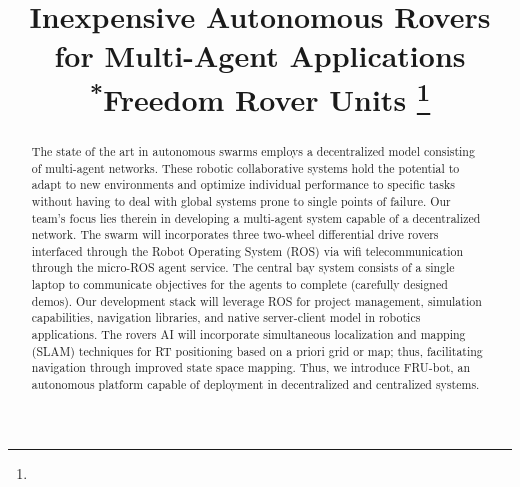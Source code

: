 \documentclass[conference]{IEEEtran}
\begin{document}
\begin{titlepage}
	\title{Inexpensive Autonomous Rovers for Multi-Agent Applications\\
		{\footnotesize \textsuperscript{*}Freedom Rover Units}
		\thanks{}}

	\author{
		\and
		\and
	}
	\maketitle
\end{titlepage}
\twocolumn

\begin{abstract}
The state of the art in autonomous swarms employs a decentralized model consisting of multi-agent networks. These robotic collaborative systems hold the potential to adapt to new environments and optimize individual performance to specific tasks without having to deal with global systems prone to single points of failure. Our team's focus lies therein in developing a multi-agent system capable of a decentralized network. The swarm will incorporates three two-wheel differential drive rovers interfaced through the Robot Operating System (ROS) via wifi telecommunication through the micro-ROS agent service. The central bay system consists of a single laptop to communicate objectives for the agents to complete (carefully designed demos). Our development stack will leverage ROS for project management, simulation capabilities, navigation libraries, and native server-client model in robotics applications. The rovers AI will incorporate simultaneous localization and mapping (SLAM) techniques for RT positioning based on a priori grid or map; thus, facilitating navigation through improved state space mapping. Thus, we introduce FRU-bot, an autonomous platform capable of deployment in decentralized and centralized systems.
\end{abstract}
\end{document}
